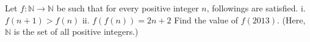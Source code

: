 Let $f:\mathbb{N} \longrightarrow \mathbb{N}$ be such that for every positive integer $n$, followings are satisfied.
i. $f(n+1) > f(n)$
ii. $f(f(n)) = 2n+2$
Find the value of $f(2013)$.
(Here, $\mathbb{N}$ is the set of all positive integers.)